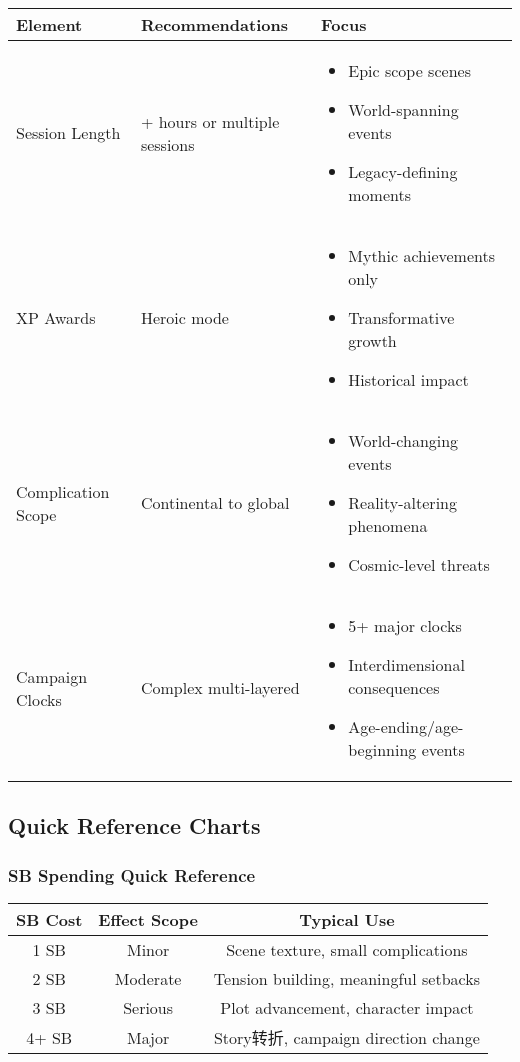 \documentclass[11pt,letterpaper]{article}
\begin{document}
\begin{longtable}{|>{\raggedright\arraybackslash}p{3cm}|>{\raggedright\arraybackslash}p{4cm}|>{\raggedright\arraybackslash}p{5cm}|}
\hline
\textbf{Element} & \textbf{Recommendations} & \textbf{Focus} \\
\hline
Session Length & 6+ hours or multiple sessions & 
\begin{itemize}
    \item Epic scope scenes
    \item World-spanning events
    \item Legacy-defining moments
\end{itemize} \\
\hline
XP Awards & Heroic mode & 
\begin{itemize}
    \item Mythic achievements only
    \item Transformative growth
    \item Historical impact
\end{itemize} \\
\hline
Complication Scope & Continental to global & 
\begin{itemize}
    \item World-changing events
    \item Reality-altering phenomena
    \item Cosmic-level threats
\end{itemize} \\
\hline
Campaign Clocks & Complex multi-layered & 
\begin{itemize}
    \item 5+ major clocks
    \item Interdimensional consequences
    \item Age-ending/age-beginning events
\end{itemize} \\
\hline
\end{longtable}

\subsection{Quick Reference Charts}

\subsubsection{SB Spending Quick Reference}

\begin{center}
\begin{tabular}{|c|c|c|}
\hline
\textbf{SB Cost} & \textbf{Effect Scope} & \textbf{Typical Use} \\
\hline
1 SB & Minor & Scene texture, small complications \\
\hline
2 SB & Moderate & Tension building, meaningful setbacks \\
\hline
3 SB & Serious & Plot advancement, character impact \\
\hline
4+ SB & Major & Story转折, campaign direction change \\
\hline
\end{tabular}
\end{center}
\end{document}
